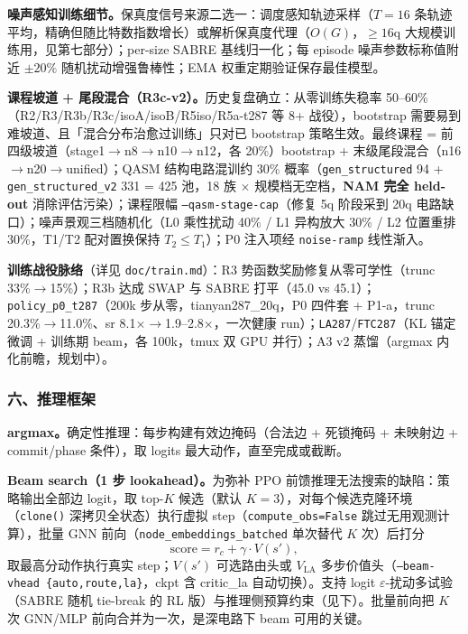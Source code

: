 \textbf{噪声感知训练细节。}保真度信号来源二选一：调度感知轨迹采样（$T=16$ 条轨迹平均，精确但随比特数指数增长）或解析保真度代理（$O(G)$，$\ge16$q 大规模训练用，见第七部分）；per-size SABRE 基线归一化；每 episode 噪声参数标称值附近 $\pm20\%$ 随机扰动增强鲁棒性；EMA 权重定期验证保存最佳模型。

\textbf{课程坡道 + 尾段混合（R3c-v2）。}历史复盘确立：从零训练失稳率 50--60\%（R2/R3/R3b/R3c/isoA/isoB/R5iso/R5a-t287 等 8+ 战役），bootstrap 需要易到难坡道、且「混合分布治愈过训练」只对已 bootstrap 策略生效。最终课程 = 前四级坡道（stage1$\to$n8$\to$n10$\to$n12，各 20\%）bootstrap + 末级尾段混合（n16$\to$n20$\to$unified）；QASM 结构电路混训约 30\% 概率（\texttt{gen\_structured} 94 + \texttt{gen\_structured\_v2} 331 = 425 池，18 族 $\times$ 规模档无空档，\textbf{NAM 完全 held-out} 消除评估污染）；课程限幅 \texttt{--qasm-stage-cap}（修复 5q 阶段采到 20q 电路缺口）；噪声景观三档随机化（L0 乘性扰动 40\% / L1 异构放大 30\% / L2 位置重排 30\%，T1/T2 配对置换保持 $T_2\le T_1$）；P0 注入项经 \texttt{noise-ramp} 线性渐入。

\textbf{训练战役脉络}（详见 \texttt{doc/train.md}）：R3 势函数奖励修复从零可学性（trunc 33\%$\to$15\%）；R3b 达成 SWAP 与 SABRE 打平（45.0 vs 45.1）；\texttt{policy\_p0\_t287}（200k 步从零，tianyan287\_20q，P0 四件套 + P1-a，trunc 20.3\%$\to$11.0\%、sr 8.1$\times\to$1.9--2.8$\times$，一次健康 run）；\texttt{LA287}/\texttt{FTC287}（KL 锚定微调 + 训练期 beam，各 100k，tmux 双 GPU 并行）；A3 v2 蒸馏（argmax 内化前瞻，规划中）。


\subsubsection{六、推理框架}

\textbf{argmax。}确定性推理：每步构建有效边掩码（合法边 + 死锁掩码 + 未映射边 + commit/phase 条件），取 logits 最大动作，直至完成或截断。

\textbf{Beam search（1 步 lookahead）。}为弥补 PPO 前馈推理无法搜索的缺陷：策略输出全部边 logit，取 top-$K$ 候选（默认 $K=3$），对每个候选克隆环境（\texttt{clone()} 深拷贝全状态）执行虚拟 step（\texttt{compute\_obs=False} 跳过无用观测计算），批量 GNN 前向（\texttt{node\_embeddings\_batched} 单次替代 $K$ 次）后打分
\[
\mathrm{score}=r_c+\gamma\cdot V(s'),
\]
取最高分动作执行真实 step；$V(s')$ 可选路由头或 $V_{\mathrm{LA}}$ 多步价值头（\texttt{--beam-vhead \{auto,route,la\}}，ckpt 含 critic\_la 自动切换）。支持 logit $\varepsilon$-扰动多试验（SABRE 随机 tie-break 的 RL 版）与推理侧预算约束（见下）。批量前向把 $K$ 次 GNN/MLP 前向合并为一次，是深电路下 beam 可用的关键。

